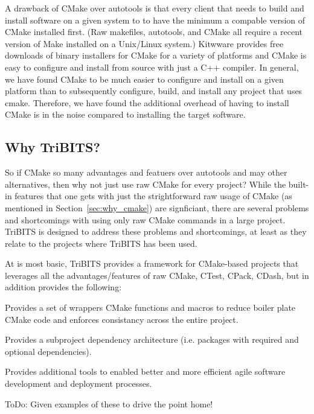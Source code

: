 \documentclass[10pt]{article}
\begin{document}
A drawback of CMake over autotools is that every client that needs to build and install software on a given system to to have the minimum a compable version of CMake installed first.  (Raw makefiles, autotools, and CMake all require a recent version of Make installed on a Unix/Linux system.)  Kitwware provides free downloads of binary installers for CMake for a variety of platforms and CMake is easy to configure and install from source with just a C++ compiler.  In general, we have found CMake to be much easier to configure and install on a given platform than to subsequently configure, build, and install any project that uses cmake.  Therefore, we have found the additional overhead of having to install CMake is in the noise compared to installing the target software.

%
\subsection{Why TriBITS?}
%

So if CMake so many advantages and featuers over autotools and may other alternatives, then why not just use raw CMake for every project?  While the built-in features that one gets with just the strightforward raw usage of CMake (as mentioned in Section~\ref{sec:why_cmake}) are signficiant, there are several problems and shortcomings with using only raw CMake commands in a large project.  TriBITS is designed to address these problems and shortcomings, at least as they relate to the projects where TriBITS has been used.

At is most basic, TriBITS provides a framework for CMake-based projects that leverages all the advantages/features of raw CMake, CTest, CPack, CDash, but in addition provides the following:

\begin{compactitem}
\item Provides a set of wrappers CMake functions and macros to reduce boiler plate CMake code and enforces consistancy across the entire project.
\item Provides a subproject dependency architecture (i.e. packages with required and optional dependencies).
\item Provides additional tools to enabled better and more efficient agile software development and deployment processes.
\end{compactitem}

ToDo: Given examples of these to drive the point home!
\end{document}
